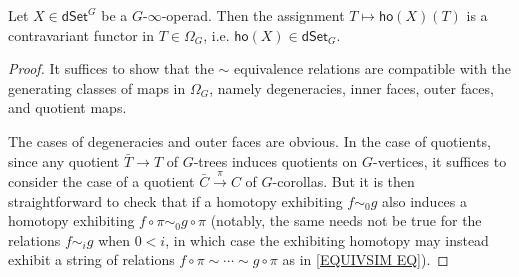 \documentclass[a4paper,10pt
,draft
]{article}%
\renewcommand{\1}{\eta}%
\begin{document}
\begin{proposition}
Let $X \in \mathsf{dSet}^G$ be a $G$-$\infty$-operad. Then the assignment 
		$T \mapsto \mathsf{ho}(X)(T)$
		is a contravariant functor in $T \in \Omega_G$, i.e.
		$\mathsf{ho}(X)\in \mathsf{dSet}_G$.
\end{proposition}


\begin{proof}
	It suffices to show that the $\sim$ equivalence relations are compatible with the generating classes of maps in $\Omega_G$, namely
	degeneracies, inner faces, outer faces, and quotient maps.
	
	The cases of degeneracies and outer faces are obvious. In the case of quotients, 
	since any quotient $\bar{T} \to T$ of $G$-trees induces quotients on $G$-vertices, it suffices to consider the case of a quotient
	$\bar{C} \xrightarrow{\pi} C$ of $G$-corollas.
	But it is then straightforward to check that if a homotopy exhibiting $f \sim_0 g$ also induces a homotopy exhibiting 
	$f \circ \pi \sim_0 g \circ \pi$
	(notably, the same needs not be true for the relations $f \sim_i g$ when $0<i$, 
	in which case the exhibiting homotopy 
	may instead exhibit a string of relations 
	$f \circ \pi \sim \cdots \sim g \circ \pi$
	as in \eqref{EQUIVSIM EQ}).


\end{proof}
\end{document}
